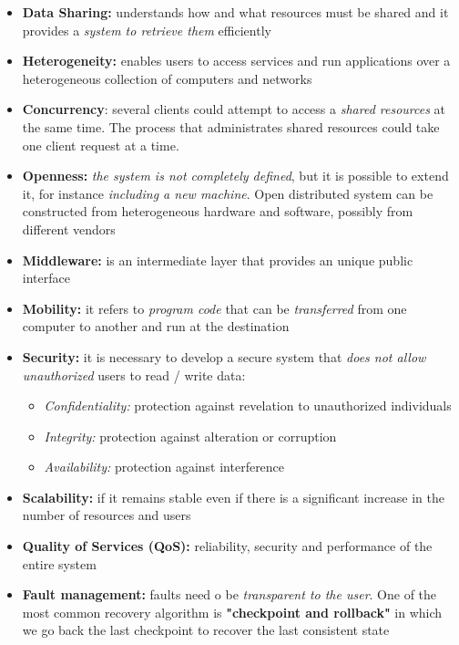 \begin{itemize}
    \item \textbf{Data Sharing:} understands how and what resources must be shared and it provides a \textit{system to retrieve them} efficiently
    \item \textbf{Heterogeneity:} enables users to access services and run applications over a heterogeneous collection of computers and networks
    \item \textbf{Concurrency}: several clients could attempt to access a \textit{shared resources} at the same time. The process that administrates shared resources could take one client request at a time.
    \item \textbf{Openness:} \textit{the system is not completely defined}, but it is possible to extend it, for instance \textit{including a new machine}. Open distributed system can be constructed from heterogeneous hardware and software, possibly from different vendors
    \item \textbf{Middleware:} is an intermediate layer that provides an unique public interface
    \item \textbf{Mobility:} it refers to \textit{program code} that can be \textit{transferred} from one computer to another and run at the destination
    \item \textbf{Security:} it is necessary to develop a secure system that \textit{does not allow unauthorized} users to read / write data:
        \begin{itemize}
            \item \textit{Confidentiality:} protection against revelation to unauthorized individuals
            \item \textit{Integrity:} protection against alteration or corruption
            \item \textit{Availability:} protection against interference
        \end{itemize}
    \item \textbf{Scalability:} if it remains stable even if there is a significant increase in the number of resources and users
    \item \textbf{Quality of Services (QoS):} reliability, security and performance of the entire system
    \item \textbf{Fault management:} faults need o be \textit{transparent to the user}. One of the most common recovery algorithm is \textbf{"checkpoint and rollback"} in which we go back the last checkpoint to recover the last consistent state

\end{itemize}
